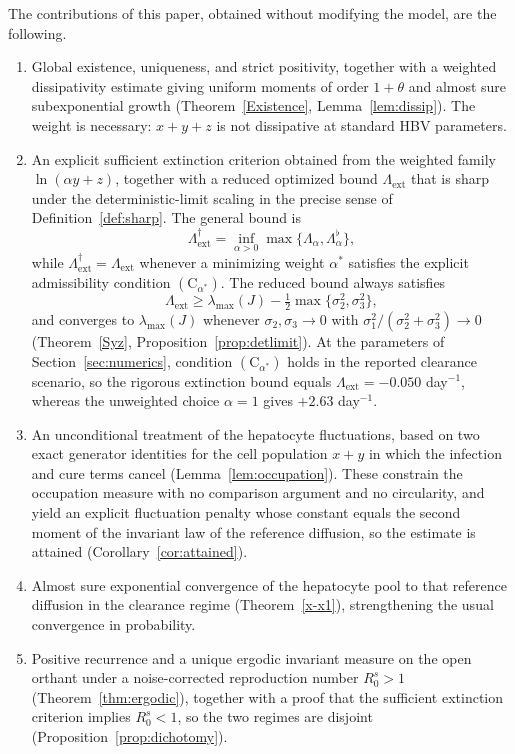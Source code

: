 \documentclass{article}
\newcommand{\Rs}{R_0^{s}}
\newcommand{\Lext}{\Lambda_{\mathrm{ext}}}
\newcommand{\Lsharp}{\Lambda_{\mathrm{ext}}^{\dagger}}
\begin{document}
The contributions of this paper, obtained without modifying the model, are the following.
\begin{enumerate}
\item[(C1)] Global existence, uniqueness, and strict positivity, together with a weighted dissipativity estimate giving uniform moments of order $1+\theta$ and almost sure subexponential growth (Theorem~\ref{Existence}, Lemma~\ref{lem:dissip}). The weight is necessary: $x+y+z$ is not dissipative at standard HBV parameters.
\item[(C2)] An explicit sufficient extinction criterion obtained from the weighted family $\ln(\alpha y+z)$, together with a reduced optimized bound $\Lext$ that is sharp under the deterministic-limit scaling in the precise sense of Definition~\ref{def:sharp}. The general bound is
\[
\Lsharp=\inf_{\alpha>0}\max\{\Lambda_\alpha,\Lambda_\alpha^\flat\},
\]
while $\Lsharp=\Lext$ whenever a minimizing weight $\alpha^\ast$ satisfies the explicit admissibility condition $(\mathrm{C}_{\alpha^\ast})$. The reduced bound always satisfies
\[
\Lext\ge
\lambda_{\max}(J)-\tfrac12\max\{\sigma_2^2,\sigma_3^2\},
\]
and converges to $\lambda_{\max}(J)$ whenever $\sigma_2,\sigma_3\to0$ with
$\sigma_1^2/(\sigma_2^2+\sigma_3^2)\to0$
(Theorem~\ref{Syz}, Proposition~\ref{prop:detlimit}). At the parameters of Section~\ref{sec:numerics}, condition $(\mathrm{C}_{\alpha^\ast})$ holds in the reported clearance scenario, so the rigorous extinction bound equals $\Lext=-0.050$ day$^{-1}$, whereas the unweighted choice $\alpha=1$ gives $+2.63$ day$^{-1}$.

\item[(C3)] An unconditional treatment of the hepatocyte fluctuations, based on two exact generator identities for the cell population $x+y$ in which the infection and cure terms cancel (Lemma~\ref{lem:occupation}). These constrain the occupation measure with no comparison argument and no circularity, and yield an explicit fluctuation penalty whose constant equals the second moment of the invariant law of the reference diffusion, so the estimate is attained (Corollary~\ref{cor:attained}).
\item[(C4)] Almost sure exponential convergence of the hepatocyte pool to that reference diffusion in the clearance regime (Theorem~\ref{x-x1}), strengthening the usual convergence in probability.
\item[(C5)] Positive recurrence and a unique ergodic invariant measure on the open orthant under a noise-corrected reproduction number $\Rs>1$ (Theorem~\ref{thm:ergodic}), together with a proof that the sufficient extinction criterion implies $\Rs<1$, so the two regimes are disjoint (Proposition~\ref{prop:dichotomy}).
\end{enumerate}
\end{document}
